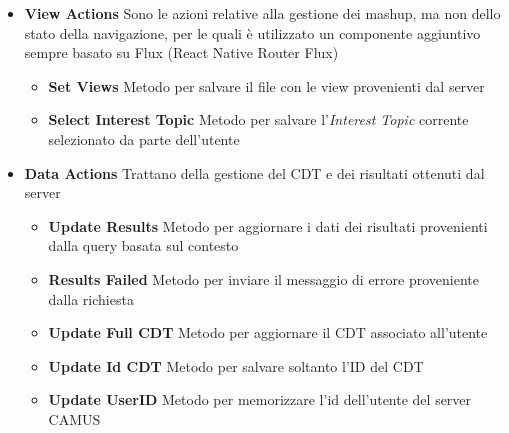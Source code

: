 \begin{itemize}
\begin{itemize}
	\end{itemize}
	\item \textbf{View Actions} Sono le azioni relative alla gestione dei mashup, ma non dello stato della navigazione, per le quali è utilizzato un componente aggiuntivo sempre basato su Flux (React Native Router Flux)
	\begin{itemize}
		\item \textbf{Set Views} Metodo per salvare il file con le view provenienti dal server 
		\item \textbf{Select Interest Topic} Metodo per salvare l'\emph{Interest Topic} corrente selezionato da parte dell'utente
	\end{itemize}
	\item \textbf{Data Actions} Trattano della gestione del CDT e dei risultati ottenuti dal server
	\begin{itemize}
		\item \textbf{Update Results} Metodo per aggiornare i dati dei risultati provenienti dalla query basata sul contesto
		\item \textbf{Results Failed} Metodo per inviare il messaggio di errore proveniente dalla richiesta
		\item \textbf{Update Full CDT} Metodo per aggiornare il CDT associato all'utente
		\item \textbf{Update Id CDT} Metodo per salvare soltanto l'ID del CDT
		\item \textbf{Update UserID} Metodo per memorizzare l'id dell'utente del server CAMUS
	\end{itemize}
\end{itemize}


